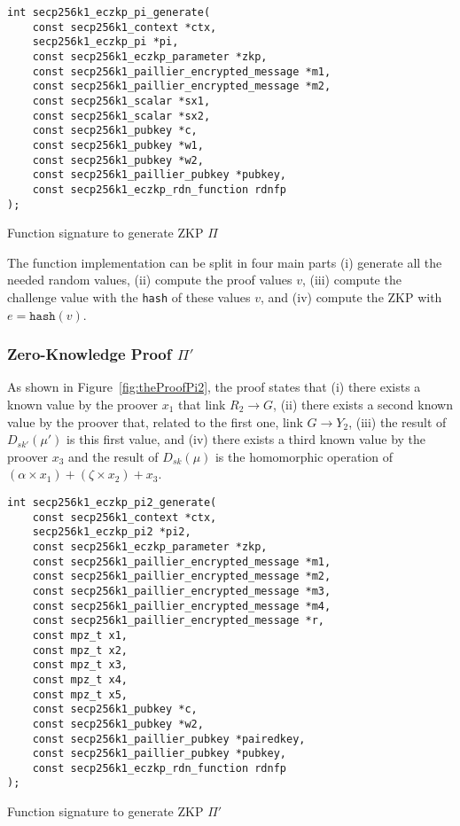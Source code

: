 \begin{listing}
  \begin{verbatim}
int secp256k1_eczkp_pi_generate(
    const secp256k1_context *ctx,
    secp256k1_eczkp_pi *pi,
    const secp256k1_eczkp_parameter *zkp,
    const secp256k1_paillier_encrypted_message *m1,
    const secp256k1_paillier_encrypted_message *m2,
    const secp256k1_scalar *sx1,
    const secp256k1_scalar *sx2,
    const secp256k1_pubkey *c,
    const secp256k1_pubkey *w1,
    const secp256k1_pubkey *w2,
    const secp256k1_paillier_pubkey *pubkey,
    const secp256k1_eczkp_rdn_function rdnfp
);
  \end{verbatim}
	\caption{Function signature to generate ZKP $\Pi$}
	\label{lst:funcSigGeneratePi}
\end{listing}

The function implementation can be split in four main parts (i) generate all
the needed random values, (ii) compute the proof values $v$, (iii) compute
the challenge value with the \texttt{hash} of these values $v$, and (iv) compute
the ZKP with $e = \texttt{hash}(v)$.

\subsubsection{Zero-Knowledge Proof $\Pi'$}

As shown in Figure~\ref{fig:theProofPi2}, the proof states that (i) there exists a
known value by the proover $x_1$ that link $R_2 \rightarrow G$, (ii) there exists a
second known value by the proover that, related to the first one, link $G
\rightarrow Y_2$, (iii) the result of $D_{sk'}(\mu')$ is this first value, and
(iv) there exists a third known value by the proover $x_3$ and the result of
$D_{sk}(\mu)$ is the homomorphic operation of $(\alpha \times x_1) + (\zeta
\times x_2) + x_3$.

\begin{listing}
  \begin{verbatim}
int secp256k1_eczkp_pi2_generate(
    const secp256k1_context *ctx,
    secp256k1_eczkp_pi2 *pi2,
    const secp256k1_eczkp_parameter *zkp,
    const secp256k1_paillier_encrypted_message *m1,
    const secp256k1_paillier_encrypted_message *m2,
    const secp256k1_paillier_encrypted_message *m3,
    const secp256k1_paillier_encrypted_message *m4,
    const secp256k1_paillier_encrypted_message *r,
    const mpz_t x1,
    const mpz_t x2,
    const mpz_t x3,
    const mpz_t x4,
    const mpz_t x5,
    const secp256k1_pubkey *c,
    const secp256k1_pubkey *w2,
    const secp256k1_paillier_pubkey *pairedkey,
    const secp256k1_paillier_pubkey *pubkey,
    const secp256k1_eczkp_rdn_function rdnfp
);
  \end{verbatim}
	\caption{Function signature to generate ZKP $\Pi'$}
	\label{lst:funcSigGeneratePi2}
\end{listing}

